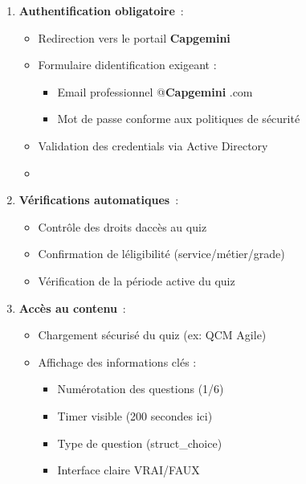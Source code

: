 \documentclass[12pt,a4paper,twoside,openright]{report}
\begin{document}
\begin{enumerate}
\def\labelenumi{\arabic{enumi}.}
\item
  \textbf{Authentification obligatoire}~:

  \begin{itemize}
  \item
    Redirection vers le portail \textbf{Capgemini}
  \item
    Formulaire d\textquotesingle identification exigeant :

    \begin{itemize}
    \item
      Email professionnel @\textbf{Capgemini} .com
    \item
      Mot de passe conforme aux politiques de sécurité
    \end{itemize}
  \item
    Validation des credentials via Active Directory
  \item
  \end{itemize}
\item
  \textbf{Vérifications automatiques}~:

  \begin{itemize}
  \item
    Contrôle des droits d\textquotesingle accès au quiz
  \item
    Confirmation de l\textquotesingle éligibilité (service/métier/grade)
  \item
    Vérification de la période active du quiz
  \end{itemize}
\item
  \textbf{Accès au contenu}~:

  \begin{itemize}
  \item
    Chargement sécurisé du quiz (ex: QCM Agile)
  \item
    Affichage des informations clés :

    \begin{itemize}
    \item
      Numérotation des questions (1/6)
    \item
      Timer visible (200 secondes ici)
    \item
      Type de question (struct\_choice)
    \item
      Interface claire VRAI/FAUX
    \end{itemize}
  \end{itemize}
\end{enumerate}
\end{document}
